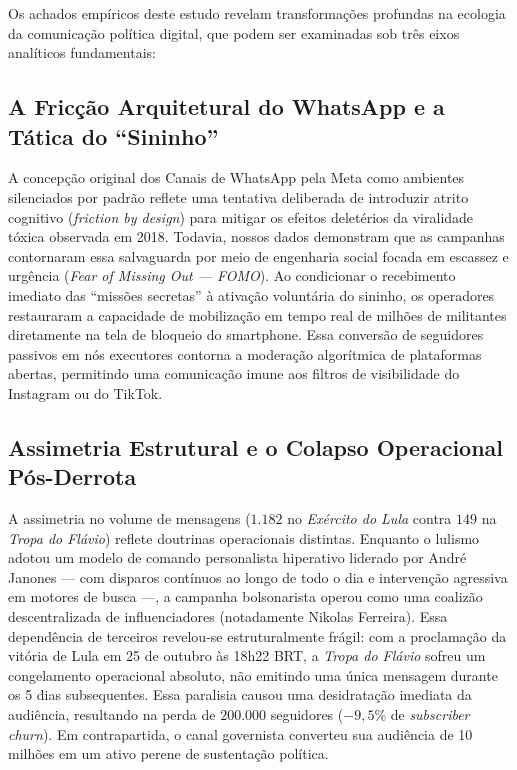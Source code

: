 \documentclass[12pt]{article}
\begin{document}
Os achados empíricos deste estudo revelam transformações profundas na ecologia da comunicação política digital, que podem ser examinadas sob três eixos analíticos fundamentais:

\subsection{A Fricção Arquitetural do WhatsApp e a Tática do ``Sininho''}
A concepção original dos Canais de WhatsApp pela Meta como ambientes silenciados por padrão reflete uma tentativa deliberada de introduzir atrito cognitivo (\textit{friction by design}) para mitigar os efeitos deletérios da viralidade tóxica observada em 2018. Todavia, nossos dados demonstram que as campanhas contornaram essa salvaguarda por meio de engenharia social focada em escassez e urgência (\textit{Fear of Missing Out --- FOMO}). Ao condicionar o recebimento imediato das ``missões secretas'' à ativação voluntária do sininho, os operadores restauraram a capacidade de mobilização em tempo real de milhões de militantes diretamente na tela de bloqueio do smartphone. Essa conversão de seguidores passivos em nós executores contorna a moderação algorítmica de plataformas abertas, permitindo uma comunicação imune aos filtros de visibilidade do Instagram ou do TikTok.

\subsection{Assimetria Estrutural e o Colapso Operacional Pós-Derrota}
A assimetria no volume de mensagens ($1.182$ no \textit{Exército do Lula} contra $149$ na \textit{Tropa do Flávio}) reflete doutrinas operacionais distintas. Enquanto o lulismo adotou um modelo de comando personalista hiperativo liderado por André Janones — com disparos contínuos ao longo de todo o dia e intervenção agressiva em motores de busca —, a campanha bolsonarista operou como uma coalizão descentralizada de influenciadores (notadamente Nikolas Ferreira). Essa dependência de terceiros revelou-se estruturalmente frágil: com a proclamação da vitória de Lula em 25 de outubro às 18h22 BRT, a \textit{Tropa do Flávio} sofreu um congelamento operacional absoluto, não emitindo uma única mensagem durante os 5 dias subsequentes. Essa paralisia causou uma desidratação imediata da audiência, resultando na perda de $200.000$ seguidores ($-9,5\%$ de \textit{subscriber churn}). Em contrapartida, o canal governista converteu sua audiência de 10 milhões em um ativo perene de sustentação política.
\end{document}
